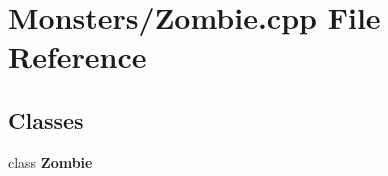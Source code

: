 \section{Monsters/\-Zombie.cpp File Reference}
\label{_zombie_8cpp}
\subsection*{Classes}
\begin{DoxyCompactItemize}
\item 
class {\bf Zombie}
\end{DoxyCompactItemize}
